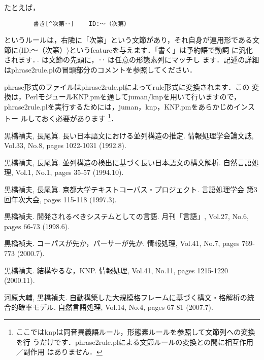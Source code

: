 \documentclass[a4j,11pt,titlepage]{jarticle}
\def\fl{$\langle$}
\def\fr{$\rangle$}
\begin{document}
たとえば，
\begin{verbatim}
        書き[^次第‥]    ID:〜（次第）
\end{verbatim}
というルールは，右隣に「次第」という文節があり，それ自身が連用形である文
節に\fl ID:〜（次第）\fr というfeatureを与えます．「書く」は予約語で動詞
に汎化されます．$\hat{ }$ は文節の先頭に，‥ は任意の形態素列にマッチし
ます．記述の詳細はphrase2rule.plの冒頭部分のコメントを参照してください．

phrase形式のファイルはphrase2rule.plによってrule形式に変換されます．この
変換は，PerlモジュールKNP.pmを通してjuman/knpを用いて行いますので，
phrase2rule.plを実行するためには，juman，knp，KNP.pmをあらかじめインストー
ルしておく必要があります
\footnote{
ここではknpは同音異義語ルール，形態素ルールを参照して文節列への変換を行
うだけです．phrase2rule.plによる文節ルールの変換との間に相互作用／副作用
はありません．}．

\begin{thebibliography}{}

黒橋禎夫, 長尾眞.
\newblock 長い日本語文における並列構造の推定.
\newblock 情報処理学会論文誌, Vol.33, No.8, pages 1022-1031 (1992.8).

黒橋禎夫, 長尾眞.
\newblock 並列構造の検出に基づく長い日本語文の構文解析.
\newblock 自然言語処理, Vol.1, No.1, pages 35-57 (1994.10).

黒橋禎夫, 長尾眞.
\newblock 京都大学テキストコーパス・プロジェクト.
\newblock 言語処理学会 第3回年次大会, pages 115-118 (1997.3).

黒橋禎夫.
\newblock 開発されるべきシステムとしての言語.
\newblock 月刊「言語」, Vol.27, No.6, pages 66-73 (1998.6).

黒橋禎夫.
\newblock コーパスが先か，パーサーが先か.
\newblock 情報処理, Vol.41, No.7, pages 769-773 (2000.7).

黒橋禎夫.
\newblock 結構やるな，KNP.
\newblock 情報処理, Vol.41, No.11, pages 1215-1220 (2000.11).

河原大輔, 黒橋禎夫.
\newblock 自動構築した大規模格フレームに基づく構文・格解析の統合的確率モデル.
\newblock 自然言語処理, Vol.14, No.4, pages 67-81 (2007.7).

\end{thebibliography}

\clearpage

\end{document}

